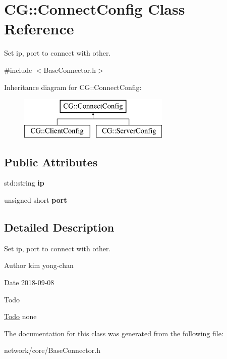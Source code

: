 \hypertarget{class_c_g_1_1_connect_config}{}\section{CG\+:\+:Connect\+Config Class Reference}
\label{class_c_g_1_1_connect_config}


Set ip, port to connect with other.  




{\ttfamily \#include $<$Base\+Connector.\+h$>$}

Inheritance diagram for CG\+:\+:Connect\+Config\+:\begin{figure}[H]
\begin{center}
\leavevmode
\includegraphics[height=2.000000cm]{class_c_g_1_1_connect_config}
\end{center}
\end{figure}
\subsection*{Public Attributes}
\begin{DoxyCompactItemize}
\item 
\mbox{\label{class_c_g_1_1_connect_config_ac8d98bcc93d6e5c968e95a4d4889570a}} 
std\+::string {\bfseries ip}
\item 
\mbox{\label{class_c_g_1_1_connect_config_a965e42dcfa75b535e54d682461295293}} 
unsigned short {\bfseries port}
\end{DoxyCompactItemize}


\subsection{Detailed Description}
Set ip, port to connect with other. 

\begin{DoxyAuthor}{Author}
kim yong-\/chan 
\end{DoxyAuthor}
\begin{DoxyDate}{Date}
2018-\/09-\/08 
\end{DoxyDate}
\begin{DoxyRefDesc}{Todo}
\item[\mbox{\hyperlink{todo__todo000002}{Todo}}]none \end{DoxyRefDesc}


The documentation for this class was generated from the following file\+:\begin{DoxyCompactItemize}
\item 
network/core/Base\+Connector.\+h\end{DoxyCompactItemize}
